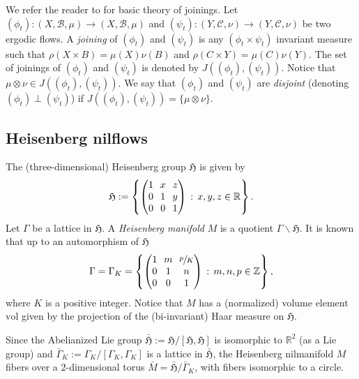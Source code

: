 \documentclass[10pt]{amsart}
\let\mathcal\mathscr
\newcommand{\vol}{\mathrm{vol}}
\newcommand{\sep}{\,:\,}
\theoremstyle{definition}
\theoremstyle{plain}
\newcommand\RR{\mathbb{R}}
\newcommand\ZZ{\mathbb{Z}}
\newcommand\cB{\mathcal{B}}
\newcommand\cC{\mathcal{C}}
\begin{document}
We refer the reader to \cite{Gla} for basic theory of joinings.
Let $(\phi_t):(X,\cB,\mu)\to (X,\cB,\mu)$ and $(\psi_t):(Y,\cC,\nu)\to (Y,\cC,\nu)$ be two ergodic flows. A \emph{joining} of $(\phi_t)$ and $(\psi_t)$ is any $(\phi_t\times \psi_t)$ invariant measure such that $\rho(X\times B)=\mu(X)\nu(B)$ and $\rho(C\times Y)=\mu(C)\nu(Y)$. The set of joinings of $(\phi_t)$ and $(\psi_t)$ is denoted by $J((\phi_t),(\psi_t))$. Notice that $\mu\otimes \nu \in J((\phi_t),(\psi_t))$. We say that $(\phi_t)$ and $(\psi_t)$ are \emph{disjoint} (denoting $(\phi_t)\perp (\psi_t)$) if $J((\phi_t),(\psi_t))=\{\mu\otimes \nu\}$.

\subsection{Heisenberg nilflows}
The (three-dimensional) Heisenberg group $\mathfrak H$ is given by
\[\arraycolsep3.5pt
\mathfrak H:=\left\{\begin{pmatrix}1&x&z\\0&1&y\\0&0&1\end{pmatrix}\sep x,y,z\in \RR\right\}.
\]
Let $\Gamma$ be a lattice in $\mathfrak H$. A \emph{Heisenberg manifold} $M$ is a quotient $\Gamma \backslash \mathfrak H$. It is known that up to an automorphism of
$\mathfrak H$
\[\arraycolsep3.5pt
\Gamma=\Gamma_K=\left\{\begin{pmatrix}1&m&\sfrac{p}{K}\\0&1&n\\0&0&1
\end{pmatrix}\sep m,n,p\in \ZZ\right\},
\]
where $K$ is a positive integer. Notice that $M$ has a (normalized) volume element $\vol$ given by the projection of the (bi-invariant) Haar
measure on $\mathfrak H$.

Since the Abelianized Lie group $\bar{\mathfrak H}:= \mathfrak H/[\mathfrak H,\mathfrak H]$ is isomorphic to $\RR^2$ (as a Lie group) and $\bar \Gamma_K := \Gamma_K/[\Gamma_K,\Gamma_K]$ is a lattice in
$\bar {\mathfrak H}$, the Heisenberg nilmanifold $M$ fibers over a $2$-dimensional torus $\bar M= \bar {\mathfrak H}/ \bar \Gamma_K$, with fibers isomorphic to a circle.
\end{document}
